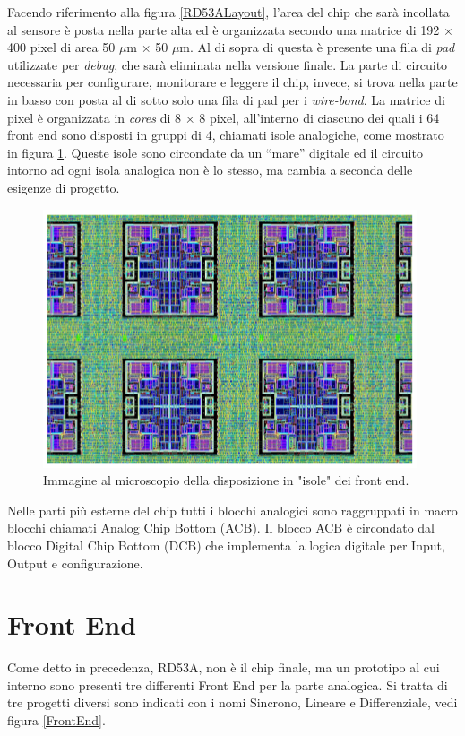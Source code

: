 Facendo riferimento alla figura \ref{RD53ALayout}, l'area del chip che sarà incollata al sensore è posta nella parte alta ed è organizzata secondo una matrice di 192 $\times$ 400 pixel di area 50 $\mu$m $\times$ 50 $\mu$m.
Al di sopra di questa è presente una fila di \textit{pad} utilizzate per \textit{debug}, che sarà eliminata nella versione finale.
La parte di circuito necessaria per configurare, monitorare e leggere il chip, invece, si trova nella parte in basso con posta al di sotto solo una fila di pad per i \textit{wire-bond}. 
La matrice di pixel è organizzata in \textit{cores} di 8 $\times$ 8 pixel, all'interno di ciascuno dei quali i 64 front end sono disposti in gruppi di 4, chiamati isole analogiche, come mostrato in figura \ref{AnalogIsland}. 
Queste isole sono circondate da un ``mare'' digitale ed il circuito intorno ad ogni isola analogica non è lo stesso, ma cambia a seconda delle esigenze di progetto. 
\begin{figure}
\centering
\includegraphics[scale=.5]{Immagini/AnalogIsland}
\caption{Immagine al microscopio della disposizione in "isole" dei front end.}
\label{AnalogIsland}
\end{figure} 
Nelle parti più esterne del chip tutti i blocchi analogici sono raggruppati in macro blocchi chiamati Analog Chip Bottom (ACB).
Il blocco ACB è circondato dal blocco Digital Chip Bottom (DCB) che implementa la logica digitale per Input, Output e configurazione. 

\section{Front End}

Come detto in precedenza, RD53A, non è il chip finale, ma un prototipo al cui interno sono presenti tre differenti Front End per la parte analogica.
Si tratta di tre progetti diversi sono indicati con i nomi Sincrono, Lineare e Differenziale, vedi figura \ref{FrontEnd}. 

